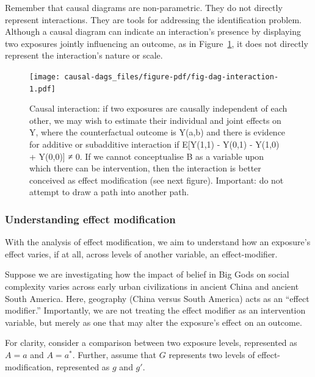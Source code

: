 \documentclass[
  singlecolumn]{report}
\begin{document}
Remember that causal diagrams are non-parametric. They do not directly
represent interactions. They are tools for addressing the identification
problem. Although a causal diagram can indicate an interaction's
presence by displaying two exposures jointly influencing an outcome, as
in Figure~\ref{fig-dag-interaction}, it does not directly represent the
interaction's nature or scale.

\begin{figure}

{\centering \texttt{[image: causal-dags\_files/figure-pdf/fig-dag-interaction-1.pdf]}

}

\caption{\label{fig-dag-interaction}Causal interaction: if two exposures
are causally independent of each other, we may wish to estimate their
individual and joint effects on Y, where the counterfactual outcome is
Y(a,b) and there is evidence for additive or subadditive interaction if
E{[}Y(1,1) - Y(0,1) - Y(1,0) + Y(0,0){]} ≠ 0. If we cannot conceptualise
B as a variable upon which there can be intervention, then the
interaction is better conceived as effect modification (see next
figure). Important: do not attempt to draw a path into another path.}

\end{figure}

\hypertarget{understanding-effect-modification}{%
\subsubsection{\texorpdfstring{\textbf{Understanding effect
modification}}{Understanding effect modification}}\label{understanding-effect-modification}}

With the analysis of effect modification, we aim to understand how an
exposure's effect varies, if at all, across levels of another variable,
an effect-modifier.

Suppose we are investigating how the impact of belief in Big Gods on
social complexity varies across early urban civilizations in ancient
China and ancient South America. Here, geography (China versus South
America) acts as an ``effect modifier.'' Importantly, we are not
treating the effect modifier as an intervention variable, but merely as
one that may alter the exposure's effect on an outcome.

For clarity, consider a comparison between two exposure levels,
represented as \(A = a\) and \(A= a^*\). Further, assume that \(G\)
represents two levels of effect-modification, represented as \(g\) and
\(g'\).
\end{document}
